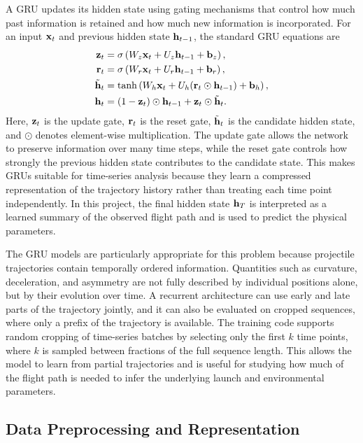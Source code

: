 A GRU updates its hidden state using gating mechanisms that control how much past information is retained and how much new information is incorporated.
For an input $\vb{x}_t$ and previous hidden state $\vb{h}_{t-1}$, the standard GRU equations are
\begin{align*}
    \vb{z}_t &= \sigma\left(W_z \vb{x}_t + U_z \vb{h}_{t-1} + \vb{b}_z\right), \\
    \vb{r}_t &= \sigma\left(W_r \vb{x}_t + U_r \vb{h}_{t-1} + \vb{b}_r\right), \\
    \tilde{\vb{h}}_t &= \tanh\left(W_h \vb{x}_t + U_h(\vb{r}_t \odot \vb{h}_{t-1}) + \vb{b}_h\right), \\
    \vb{h}_t &= (1-\vb{z}_t)\odot \vb{h}_{t-1} + \vb{z}_t \odot \tilde{\vb{h}}_t.
\end{align*}
Here, $\vb{z}_t$ is the update gate, $\vb{r}_t$ is the reset gate, $\tilde{\vb{h}}_t$ is the candidate hidden state, and $\odot$ denotes element-wise multiplication.\cite{cho2014gru}
The update gate allows the network to preserve information over many time steps, while the reset gate controls how strongly the previous hidden state contributes to the candidate state.
This makes GRUs suitable for time-series analysis because they learn a compressed representation of the trajectory history rather than treating each time point independently.
In this project, the final hidden state $\vb{h}_T$ is interpreted as a learned summary of the observed flight path and is used to predict the physical parameters.

The GRU models are particularly appropriate for this problem because projectile trajectories contain temporally ordered information.
Quantities such as curvature, deceleration, and asymmetry are not fully described by individual positions alone, but by their evolution over time.
A recurrent architecture can use early and late parts of the trajectory jointly, and it can also be evaluated on cropped sequences, where only a prefix of the trajectory is available.\cite{cho2014gru}
The training code supports random cropping of time-series batches by selecting only the first $k$ time points, where $k$ is sampled between fractions of the full sequence length.
This allows the model to learn from partial trajectories and is useful for studying how much of the flight path is needed to infer the underlying launch and environmental parameters.

\subsection{Data Preprocessing and Representation}

